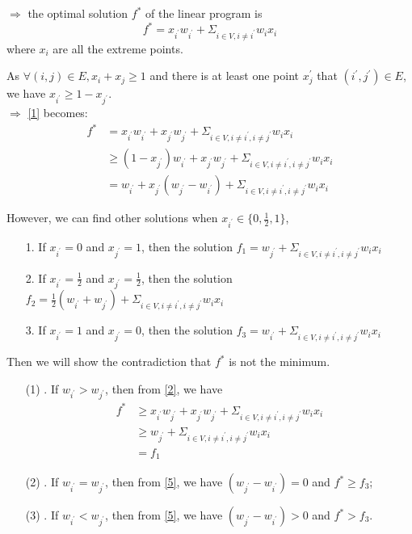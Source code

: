 \documentclass[a4paper,12pt]{article}
\begin{document}
$\Rightarrow$ the optimal solution $f^*$ of the linear program is
\begin{equation}\label{1}
f^* =  x_{i^{\prime}} w_{i^{\prime}}+\Sigma_{i \in V, i\neq i^{\prime}} w_i x_i
\end{equation}
where $x_i$ are all the extreme points.

As $\forall (i,j) \in E, x_i + x_j \geq 1$ and there is at least one point $x_j^{\prime}$ that $(i^{\prime},j^{\prime}) \in E$, we have $x_{i^{\prime}} \geq 1-x_{j^{\prime}}$.  \\
$\Rightarrow$ \eqref{1} becomes: 
\begin{align}\label{2}
f^* &=  x_{i^{\prime}} w_{i^{\prime}}+x_{j^{\prime}} w_{j^{\prime}}+\Sigma_{i \in V, i\neq i^{\prime}, i\neq j^{\prime}}  w_i x_i
\\ &  \geq (1-x_{j^{\prime}})w_{i^{\prime}} + x_{j^{\prime}} w_{j^{\prime}}+\Sigma_{i \in V, i\neq i^{\prime}, i\neq j^{\prime}}  w_i x_i
\\ & =   w_{i^{\prime}} + x_{j^{\prime}}(w_{j^{\prime}} -w_{i^{\prime}})+\Sigma_{i \in V, i\neq i^{\prime}, i\neq j^{\prime}}  w_i x_i  \label{5} 
\end{align} 
 
\noindent However, we can find other solutions when $x_{i^{\prime}} \in \{0, \frac{1}{2}, 1\}$,
\begin{enumerate}
\item[1. ] If $x_{i^{\prime}}=0$ and $x_{j^{\prime}}=1$, then the solution $f_1=w_{j^{\prime}}+\Sigma_{i \in V, i\neq i^{\prime}, i\neq j^{\prime}}  w_i x_i$ 
\item[2. ] If $x_{i^{\prime}}=\frac{1}{2}$ and $x_{j^{\prime}}=\frac{1}{2}$, then the solution $f_2=\frac{1}{2}(w_{i^{\prime}}+w_{j^{\prime}})+\Sigma_{i \in V, i\neq i^{\prime}, i\neq j^{\prime}}  w_i x_i$ 
\item[3. ] If $x_{i^{\prime}}=1$ and $x_{j^{\prime}}=0$, then the solution $f_3=w_{i^{\prime}}+\Sigma_{i \in V, i\neq i^{\prime}, i\neq j^{\prime}}  w_i x_i$\\
\end{enumerate}
Then we will show the contradiction that $f^*$ is not the minimum.
\begin{enumerate}
\item[(1) .] If $w_{i^{\prime}} > w_{j^{\prime}}$, then from \eqref{2}, we have
\begin{align}
f^* & \geq  x_{i^{\prime}} w_{j^{\prime}}+x_{j^{\prime}} w_{j^{\prime}}+\Sigma_{i \in V, i\neq i^{\prime}, i\neq j^{\prime}}  w_i x_i \\
& \geq w_{j^{\prime}}+\Sigma_{i \in V, i\neq i^{\prime}, i\neq j^{\prime}}  w_i x_i\\
& = f_1
\end{align}
\item[(2) .] If $w_{i^{\prime}} = w_{j^{\prime}}$, then from \eqref{5}, we have $(w_{j^{\prime}} -w_{i^{\prime}})=0$ and  $f^* \geq f_3$;
\item[(3) .] If $w_{i^{\prime}} < w_{j^{\prime}}$, then from \eqref{5}, we have $(w_{j^{\prime}} -w_{i^{\prime}})>0$ and $f^* > f_3$.
\end{enumerate} 
 
\end{document}
